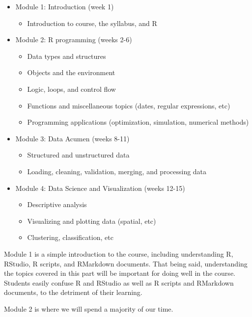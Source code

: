 \documentclass[11pt]{article}
\begin{document}
\begin{itemize}
	\item Module 1: Introduction (week 1)
	\begin{itemize}
    	\item Introduction to course, the syllabus, and R
	\end{itemize}
	
	\item Module 2: R programming (weeks 2-6)
	\begin{itemize}
    	\item Data types and structures
    	\item Objects and the environment
    	\item Logic, loops, and control flow
    	\item Functions and miscellaneous topics (dates, regular expressions, etc)
    	\item Programming applications (optimization, simulation, numerical methods)
	\end{itemize} 
	
	\item Module 3: Data Acumen (weeks 8-11)
	\begin{itemize}
    	\item Structured and unstructured data
    	\item Loading, cleaning, validation, merging, and processing data
	\end{itemize}  
	
	\item Module 4: Data Science and Visualization (weeks 12-15)
	\begin{itemize}
    	\item Descriptive analysis
    	\item Visualizing and plotting data (spatial, etc)
    	\item Clustering, classification, etc
	\end{itemize}   
\end{itemize}

Module 1 is a simple introduction to the course, including understanding R, RStudio, R scripts, and RMarkdown documents. That being said, understanding the topics covered in this part will be important for doing well in the course. Students easily confuse R and RStudio as well as R scripts and RMarkdown documents, to the detriment of their learning.

Module 2 is where we will spend a majority of our time. 
\end{document}
